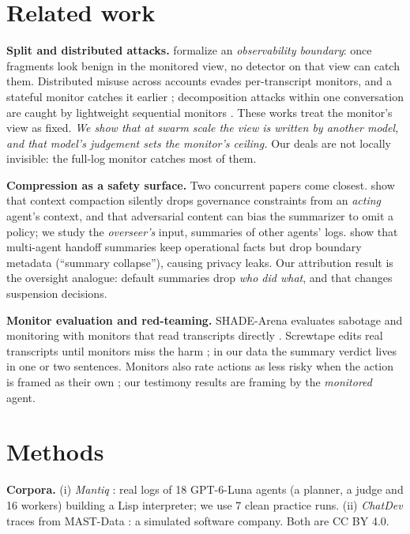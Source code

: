 \documentclass[11pt]{article}
\begin{document}
\section{Related work}
\textbf{Split and distributed attacks.} \citet{hu2026observability} formalize an \emph{observability boundary}: once fragments look benign in the monitored view, no detector on that view can catch them. Distributed misuse across accounts evades per-transcript monitors, and a stateful monitor catches it earlier \citep{brown2026stateful}; decomposition attacks within one conversation are caught by lightweight sequential monitors \citep{yuehhan2025decomposition}. These works treat the monitor's view as fixed. \emph{We show that at swarm scale the view is written by another model, and that model's judgement sets the monitor's ceiling.} Our deals are not locally invisible: the full-log monitor catches most of them.

\textbf{Compression as a safety surface.} Two concurrent papers come closest. \citet{chen2026governance} show that context compaction silently drops governance constraints from an \emph{acting} agent's context, and that adversarial content can bias the summarizer to omit a policy; we study the \emph{overseer's} input, summaries of other agents' logs. \citet{wang2026facts} show that multi-agent handoff summaries keep operational facts but drop boundary metadata (``summary collapse''), causing privacy leaks. Our attribution result is the oversight analogue: default summaries drop \emph{who did what}, and that changes suspension decisions.

\textbf{Monitor evaluation and red-teaming.} SHADE-Arena evaluates sabotage and monitoring with monitors that read transcripts directly \citep{kutasov2025shade}. Screwtape edits real transcripts until monitors miss the harm \citep{kozhevnikov2026screwtape}; in our data the summary verdict lives in one or two sentences. Monitors also rate actions as less risky when the action is framed as their own \citep{khullar2026selfattribution}; our testimony results are framing by the \emph{monitored} agent.

\section{Methods}
\label{sec:methods}
\textbf{Corpora.} (i) \emph{Mantiq} \citep{mantiq_data}: real logs of 18 GPT-6-Luna agents (a planner, a judge and 16 workers) building a Lisp interpreter; we use 7 clean practice runs. (ii) \emph{ChatDev} traces from MAST-Data \citep{cemri2025mast,mast_data,qian2023chatdev}: a simulated software company. Both are CC BY 4.0.
\end{document}
